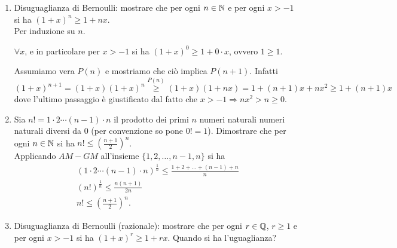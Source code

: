 \begin{enumerate}
\item Disuguaglianza di Bernoulli: mostrare che per ogni $ n \in \mathbb{N} $ e per ogni $ x > -1 $ si ha $ (1 + x)^n \geq 1 + nx $. \\

  Per induzione su $ n $.
  \begin{pbase}
    $ \forall x $, e in particolare per $ x > -1 $ si ha $ (1 + x)^0 \geq 1 + 0 \cdot x $, ovvero $ 1 \geq 1 $.
  \end{pbase}
  \begin{pind}
    Assumiamo vera $ P(n) $ e mostriamo che ciò implica $ P(n + 1) $. Infatti \[(1 + x)^{n + 1} = (1 + x) (1 + x)^n \overset{P(n)}{\geq} (1 + x)(1 + nx) = 1 + (n + 1)x + n x^2 \geq 1 + (n + 1)x\] dove l'ultimo passaggio è giustificato dal fatto che $ x > -1 \Rightarrow nx^2 > n \geq 0 $.
  \end{pind}
\item Sia $ n! = 1 \cdot 2 \cdots (n - 1) \cdot n $ il prodotto dei primi $ n $ numeri naturali numeri naturali diversi da 0 (per convenzione so pone $ 0! = 1 $). Dimostrare che per ogni $ n \in \mathbb{N} $ si ha $ n! \leq \left(\frac{n + 1}{2}\right)^n $. \\

  Applicando $ AM - GM $ all'insieme $ \{1, 2, \dots, n - 1, n\} $ si ha
  \begin{gather*}
    (1 \cdot 2 \cdots (n - 1) \cdot n)^\frac{1}{n} \leq \frac{1 + 2 + \dots + (n - 1) + n}{n} \\
    (n!)^\frac{1}{n} \leq \frac{n (n + 1)}{2n} \\
    n! \leq \left(\frac{n + 1}{2}\right)^n.
  \end{gather*}
\item Disuguaglianza di Bernoulli (razionale): mostrare che per ogni $ r \in \mathbb{Q} $, $ r \geq 1 $ e per ogni $ x > -1 $ si ha $ (1 + x)^r \geq 1 + rx $. Quando si ha l'uguaglianza? \\


\end{enumerate}
